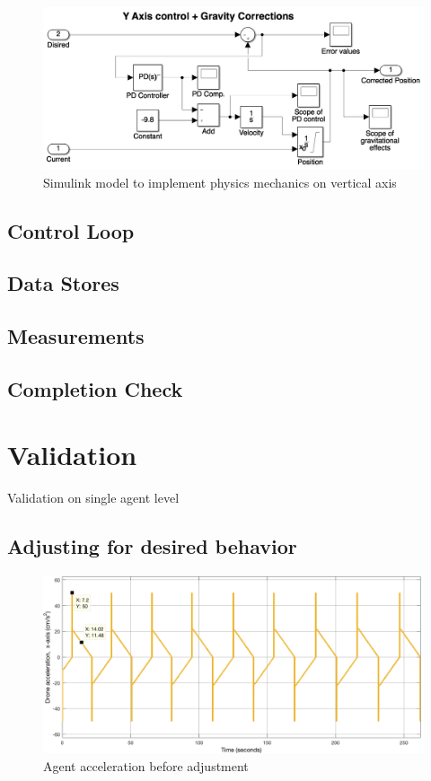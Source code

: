 \begin{figure}
	\centering
	\includegraphics[width=.8\columnwidth]{figures/simulink_gravity_y}
  	\caption{\label{fig:gravity_blocks}Simulink model to implement physics mechanics on vertical axis}
\end{figure}

\subsection{Control Loop}

\subsection{Data Stores}

\subsection{Measurements}

\subsection{Completion Check}

\section{Validation}
\label{sec:validation}

Validation on single agent level

\subsection{Adjusting for desired behavior}
\label{sec:tuning}

\begin{figure}[H]
  \centering
  \includegraphics[width=1\columnwidth]{figures/SA_accel_pre_adjustment}
  \caption{\label{fig:pre_adjust}Agent acceleration before adjustment}
\end{figure}

